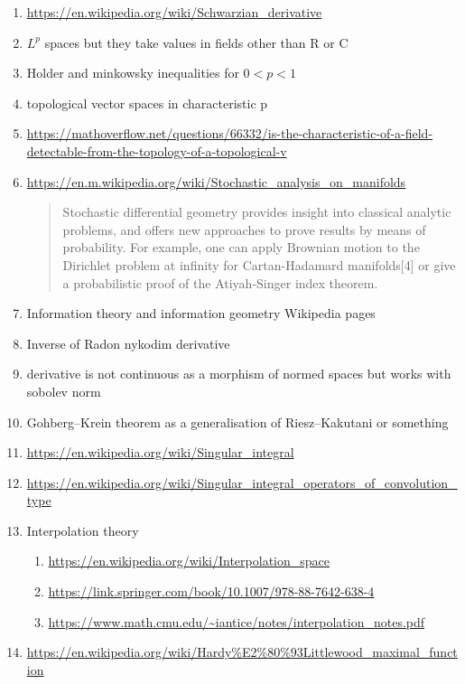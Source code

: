 \begin{enumerate}
    \item \url{https://en.wikipedia.org/wiki/Schwarzian_derivative}
    \item $L^p$ spaces but they take values in fields other than R or C
    \item Holder and minkowsky inequalities for $0\lt p\lt 1$
    \item topological vector spaces in characteristic p
    \item \url{https://mathoverflow.net/questions/66332/is-the-characteristic-of-a-field-detectable-from-the-topology-of-a-topological-v}
    \item \url{https://en.m.wikipedia.org/wiki/Stochastic_analysis_on_manifolds}
        \begin{quote}
            Stochastic differential geometry provides insight into classical analytic problems, and offers new approaches to prove results by means of probability. For example, one can apply Brownian motion to the Dirichlet problem at infinity for Cartan-Hadamard manifolds[4] or give a probabilistic proof of the Atiyah-Singer index theorem.
        \end{quote}
    \item Information theory and information geometry Wikipedia pages
    \item Inverse of Radon nykodim derivative
    \item derivative is not continuous as a morphism of normed spaces but works with sobolev norm
    \item Gohberg--Krein theorem as a generalisation of Riesz--Kakutani or something
    \item \url{https://en.wikipedia.org/wiki/Singular_integral}
    \item \url{https://en.wikipedia.org/wiki/Singular_integral_operators_of_convolution_type}
    \item Interpolation theory
        \begin{enumerate}
            \item \url{https://en.wikipedia.org/wiki/Interpolation_space}
            \item \url{https://link.springer.com/book/10.1007/978-88-7642-638-4}
            \item \url{https://www.math.cmu.edu/~iantice/notes/interpolation_notes.pdf}
        \end{enumerate}
    \item \url{https://en.wikipedia.org/wiki/Hardy\%E2\%80\%93Littlewood_maximal_function}

\end{enumerate}
